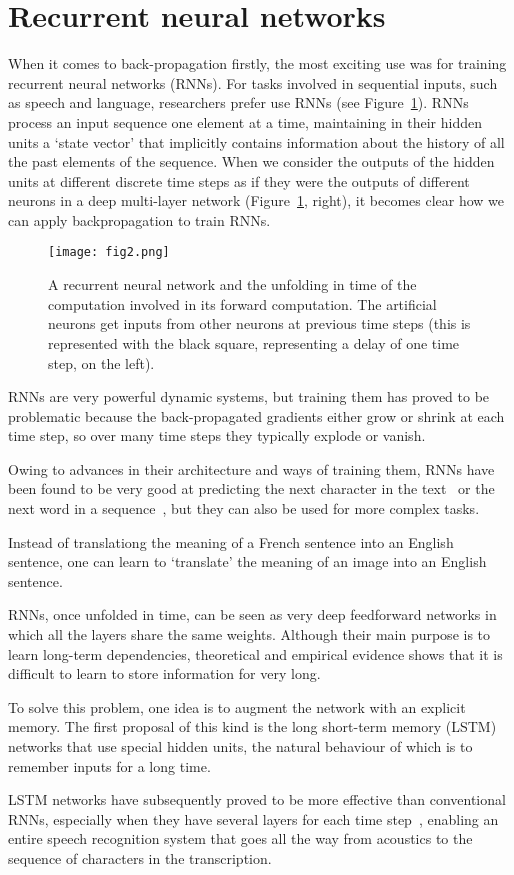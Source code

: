 \documentclass[10pt,twocolumn,letterpaper]{article}
\begin{document}
	\section*{Recurrent neural networks}
	When it comes to back-propagation firstly, the most exciting use was for training recurrent neural networks (RNNs). For tasks involved in sequential inputs, such as speech and language, researchers prefer use RNNs (see Figure~\ref{fig2}). RNNs process an input sequence one element at a time, maintaining in their hidden units a `state vector' that implicitly contains information about the history of all the past elements of the sequence. When we consider the outputs of the hidden units at different discrete time steps as if they were the outputs of different neurons in a deep multi-layer network (Figure~\ref{fig2}, right), it becomes clear how we can apply backpropagation to train RNNs.
	\begin{figure}[h]
		\centering
		\texttt{[image: fig2.png]}
		\caption{A recurrent neural network and the unfolding in time of the computation involved in its forward computation. The artificial neurons get inputs from other neurons at previous time steps (this is represented with the black square, representing a delay of one time step, on the left).} \label{fig2}
	\end{figure}
	\par
	RNNs are very powerful dynamic systems, but training them has proved to be problematic because the back-propagated gradients either grow or shrink at each time step, so over many time steps they typically explode or vanish.
	\par
	Owing to advances in their architecture and ways of training them, RNNs have been found to be very good at predicting the next character in the text~\cite{Sutskever2016Generating} or the next word in a sequence~\cite{Mikolov2013Distributed}, but they can also be used for more complex tasks.
	\par
	Instead of translationg the meaning of a French sentence into an English sentence, one can learn to `translate' the meaning of an image into an English sentence.
	\par
	RNNs, once unfolded in time, can be seen as very deep feedforward networks in which all the layers share the same weights. Although their main purpose is to learn long-term dependencies, theoretical and empirical evidence shows that it is difficult to learn to store information for very long.
	\par
	To solve this problem, one idea is to augment the network with an explicit memory. The first proposal of this kind is the long short-term memory (LSTM) networks that use special hidden units, the natural behaviour of which is to remember inputs for a long time.
	\par
	LSTM networks have subsequently proved to be more effective than conventional RNNs, especially when they have several layers for each time step~\cite{Graves2013Speech}, enabling an entire speech recognition system that goes all the way from acoustics to the sequence of characters in the transcription.
\end{document}
